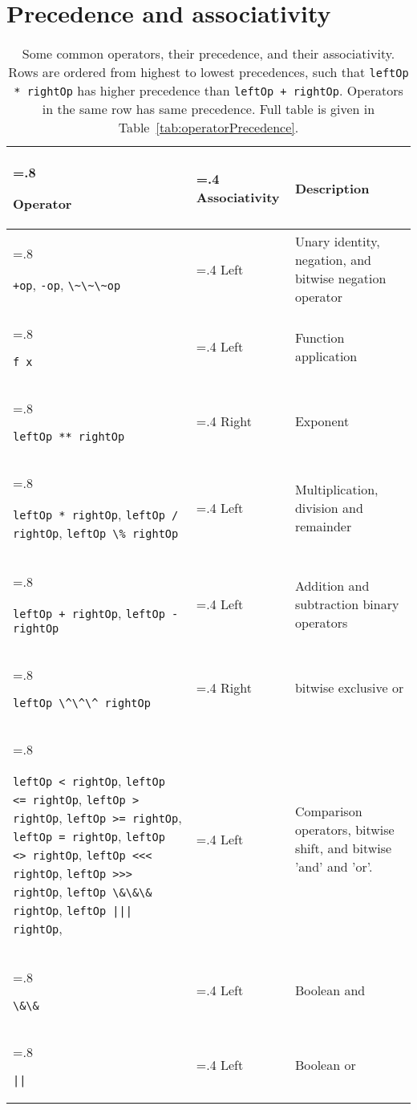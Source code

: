 \section{Precedence and associativity}
\begin{table}[ht]
  \centering
  \begin{tabularx}{\linewidth}{|>{\hsize=.8\hsize\raggedright\arraybackslash}X|>{\hsize=.4\hsize}X|>{\hsize=1.8\hsize}X|}
    \hline
    \rowcolor{headerRowColor}     Operator & Associativity & Description\\
    \hline
    \mbox{\lstinline|+op|,} \mbox{\lstinline|-op|,} \mbox{\lstinline|\~\~\~op|} & Left & Unary identity, negation, and bitwise negation operator\\
    \hline
    \lstinline|f x| & Left & Function application\\
    \hline
    \lstinline|leftOp ** rightOp| & Right & Exponent\\ 
    \hline
    \mbox{\lstinline|leftOp * rightOp|,} \mbox{\lstinline|leftOp / rightOp|,} \mbox{\lstinline|leftOp \% rightOp|} & Left & Multiplication, division and remainder\\
    \hline
    \mbox{\lstinline|leftOp + rightOp|,} \mbox{\lstinline|leftOp - rightOp|} & Left & Addition and subtraction binary operators\\
    \hline
    \lstinline|leftOp \^\^\^ rightOp| & Right & bitwise exclusive or\\
    \hline
    \mbox{\lstinline|leftOp < rightOp|,} \mbox{\lstinline|leftOp <= rightOp|,} \mbox{\lstinline|leftOp > rightOp|,} \mbox{\lstinline|leftOp >= rightOp|,} \mbox{\lstinline|leftOp = rightOp|,} \mbox{\lstinline|leftOp <> rightOp|,} \mbox{\lstinline|leftOp <<< rightOp|,} \mbox{\lstinline|leftOp >>> rightOp|,} \mbox{\lstinline|leftOp \&\&\& rightOp|,} \mbox{\lstinline!leftOp ||| rightOp!,}
             & Left & Comparison operators, bitwise shift, and bitwise 'and' and 'or'.\\
    \hline
    \lstinline|\&\&| & Left & Boolean and\\
    \hline
    \lstinline+||+ & Left & Boolean or\\
    \hline
  \end{tabularx}
  \caption{Some common operators, their precedence, and their associativity. Rows are ordered from highest to lowest precedences, such that \lstinline|leftOp * rightOp| has higher precedence than \lstinline|leftOp + rightOp|. Operators in the same row has same precedence. Full table is given in Table~\ref{tab:operatorPrecedence}.}
  \label{tab:someOperatorPrecedences}
\end{table}

